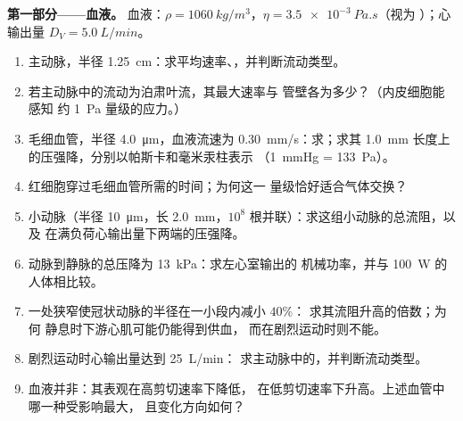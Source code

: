 \begin{problem}
\label{pb:b2:viscous-flows:1}

\medskip
\noindent\textbf{第一部分——血液。}
血液：$\rho = \qty{1060}{kg/m^3}$，$\eta = \qty{3.5e-3}{Pa.s}$（视为
）；心输出量 $D_V = \qty{5.0}{L/min}$。
\begin{enumerate}
  \item 主动脉，半径 \qty{1.25}{cm}：求平均速率、，并判断流动类型。
  \item 若主动脉中的流动为泊肃叶流，其最大速率与
        管壁各为多少？（内皮细胞能感知
        约 \qty{1}{Pa} 量级的应力。）
  \item 毛细血管，半径 \qty{4.0}{\micro m}，血液流速为
        \qty{0.30}{mm/s}：求；求其
        \qty{1.0}{mm} 长度上的压强降，分别以帕斯卡和毫米汞柱表示
        （\qty{1}{mmHg} = \qty{133}{Pa}）。
  \item 红细胞穿过毛细血管所需的时间；为何这一
        量级恰好适合气体交换？
  \item 小动脉（半径 \qty{10}{\micro m}，长 \qty{2.0}{mm}，$10^8$
        根并联）：求这组小动脉的总流阻，以及
        在满负荷心输出量下两端的压强降。
  \item 动脉到静脉的总压降为 \qty{13}{kPa}：求左心室输出的
        机械功率，并与
        \qty{100}{W} 的人体相比较。
  \item 一处狭窄使冠状动脉的半径在一小段内减小 $40\%$：
        求其流阻升高的倍数；为何
        静息时下游心肌可能仍能得到供血，
        而在剧烈运动时则不能。
  \item 剧烈运动时心输出量达到 \qty{25}{L/min}：
        求主动脉中的，并判断流动类型。
  \item 血液并非：其表观在高剪切速率下降低，
        在低剪切速率下升高。上述血管中哪一种受影响最大，
        且变化方向如何？
\end{enumerate}


\end{problem}
